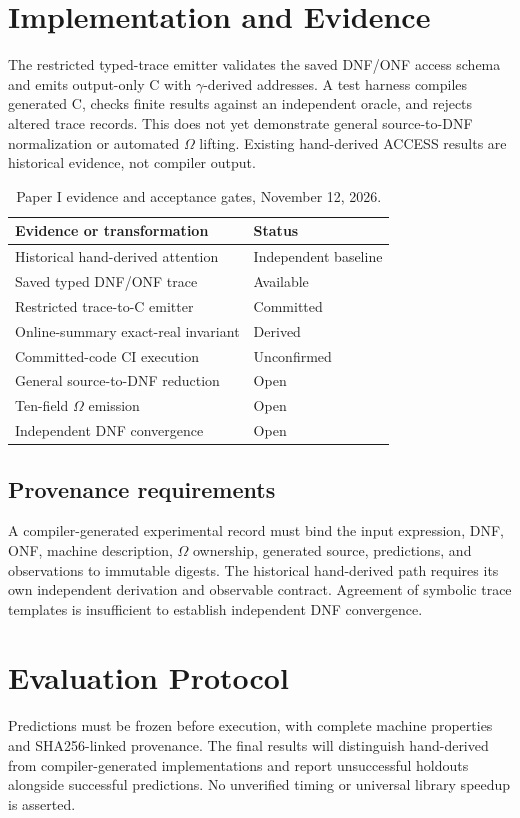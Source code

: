 \documentclass[sigplan,10pt,review,anonymous]{acmart}
\begin{document}
\section{Implementation and Evidence}
The restricted typed-trace emitter validates the saved DNF/ONF access schema and emits output-only C with $\gamma$-derived addresses. A test harness compiles generated C, checks finite results against an independent oracle, and rejects altered trace records. This does not yet demonstrate general source-to-DNF normalization or automated $\Omega$ lifting. Existing hand-derived ACCESS results are historical evidence, not compiler output.
\begin{table}[t]
\caption{Paper I evidence and acceptance gates, November 12, 2026.}
\label{tab:gates}
\centering\small
\begin{tabular}{p{}p{}}
\toprule
Evidence or transformation & Status\\
\midrule
Historical hand-derived attention & Independent baseline\\
Saved typed DNF/ONF trace & Available\\
Restricted trace-to-C emitter & Committed\\
Online-summary exact-real invariant & Derived\\
Committed-code CI execution & Unconfirmed\\
General source-to-DNF reduction & Open\\
Ten-field $\Omega$ emission & Open\\
Independent DNF convergence & Open\\
\bottomrule
\end{tabular}
\end{table}
\subsection{Provenance requirements}
A compiler-generated experimental record must bind the input expression, DNF, ONF, machine description, $\Omega$ ownership, generated source, predictions, and observations to immutable digests. The historical hand-derived path requires its own independent derivation and observable contract. Agreement of symbolic trace templates is insufficient to establish independent DNF convergence.

\section{Evaluation Protocol}
Predictions must be frozen before execution, with complete machine properties and SHA256-linked provenance. The final results will distinguish hand-derived from compiler-generated implementations and report unsuccessful holdouts alongside successful predictions. No unverified timing or universal library speedup is asserted.
\end{document}
